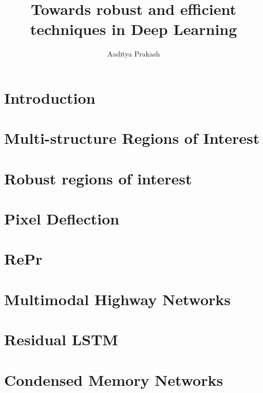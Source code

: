 \documentclass{brandeis-dissertationx}
\title{Towards robust and efficient techniques in Deep Learning}
\author{Aaditya Prakash}
\begin{document}
\acknowledgments{}
\preface{}
\signaturepage*
\thesisfront[nocopyrightpage]




\listoffigures
\listoftables
\listofalgorithms



\chapter{Introduction}


\chapter{Multi-structure Regions of Interest}


\chapter{Robust regions of interest}


\chapter{Pixel Deflection}


\chapter{RePr}


\chapter{Multimodal Highway Networks}


\chapter{Residual LSTM}


\chapter{Condensed Memory Networks}


\printbibliography
\end{document}
